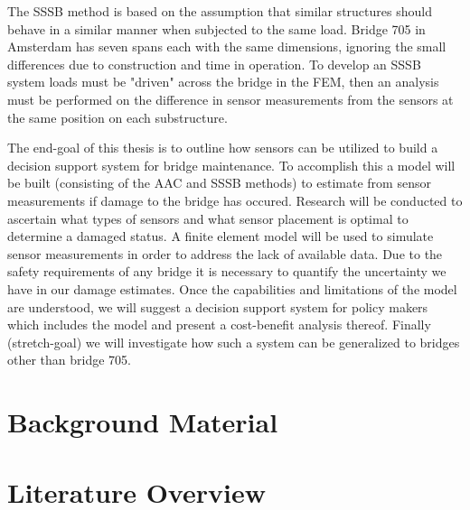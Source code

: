 \documentclass[11pt]{article}
\begin{document}
The SSSB method is based on the assumption that similar structures should
behave in a similar manner when subjected to the same load. Bridge 705 in
Amsterdam has seven spans each with the same dimensions, ignoring the small
differences due to construction and time in operation. To develop an SSSB
system loads must be "driven" across the bridge in the FEM, then an analysis
must be performed on the difference in sensor measurements from the sensors
at the same position on each substructure.

The end-goal of this thesis is to outline how sensors can be utilized to
build a decision support system for bridge maintenance. To accomplish this a
model will be built (consisting of the AAC and SSSB methods) to estimate from
sensor measurements if damage to the bridge has occured. Research will be
conducted to ascertain what types of sensors and what sensor placement is
optimal to determine a damaged status. A finite element model will be used to
simulate sensor measurements in order to address the lack of available data.
Due to the safety requirements of any bridge it is necessary to quantify the
uncertainty we have in our damage estimates. Once the capabilities and
limitations of the model are understood, we will suggest a decision support
system for policy makers which includes the model and present a cost-benefit
analysis thereof. Finally (stretch-goal) we will investigate how such a
system can be generalized to bridges other than bridge 705.
\section{Background Material}
\label{sec:org5df7368}
\section{Literature Overview}
\label{sec:orgd680adf}
\end{document}
